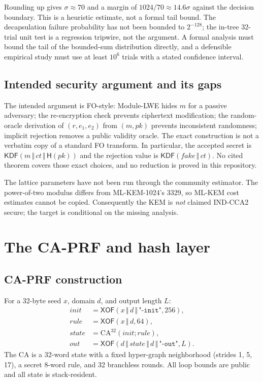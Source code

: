 \documentclass[11pt,a4paper]{article}
\theoremstyle{plain}
\theoremstyle{definition}
\theoremstyle{remark}
\newcommand{\concat}{\,\Vert\,}
\newcommand{\Hash}{\mathsf{H}}
\newcommand{\XOF}{\mathsf{XOF}}
\newcommand{\KDF}{\mathsf{KDF}}
\begin{document}
Rounding up gives $\sigma\approx 70$ and a margin of
$1024/70\approx 14.6\sigma$ against the decision boundary.  This is a
heuristic estimate, not a formal tail bound.  The decapsulation failure
probability has not been bounded to $2^{-128}$; the in-tree 32-trial
unit test is a regression tripwire, not the argument.  A formal
analysis must bound the tail of the bounded-sum distribution directly,
and a defensible empirical study must use at least $10^6$ trials with a
stated confidence interval.

\subsection{Intended security argument and its gaps}

The intended argument is FO-style: Module-LWE hides $m$ for a passive
adversary; the re-encryption check prevents ciphertext modification;
the random-oracle derivation of $(r,e_1,e_2)$ from $(m,pk)$ prevents
inconsistent randomness; implicit rejection removes a public validity
oracle.  The exact construction is not a verbatim copy of a standard FO
transform.  In particular, the accepted secret is
$\KDF(m\concat ct\concat\Hash(pk))$ and the rejection value is
$\KDF(\mathit{fake}\concat ct)$.  No cited theorem covers those exact
choices, and no reduction is proved in this repository.

The lattice parameters have not been run through the community
estimator.  The power-of-two modulus differs from ML-KEM-1024's 3329,
so ML-KEM cost estimates cannot be copied.  Consequently the KEM is
\emph{not} claimed IND-CCA2 secure; the target is conditional on the
missing analysis.

\section{The CA-PRF and hash layer}
\label{sec:hash}

\subsection{CA-PRF construction}

For a 32-byte seed $x$, domain $d$, and output length $L$:
\[
 \begin{aligned}
 \mathit{init}&=\XOF(x\concat d\concat\texttt{"-init"},256),\\
 \mathit{rule}&=\XOF(x\concat d,64),\\
 \mathit{state}&=\mathrm{CA}^{32}(\mathit{init};\mathit{rule}),\\
 \mathit{out}&=\XOF(d\concat\mathit{state}\concat d\concat
 \texttt{"-out"},L).
 \end{aligned}
\]
The CA is a 32-word state with a fixed hyper-graph neighborhood
(strides 1, 5, 17), a secret 8-word rule, and 32 branchless rounds.
All loop bounds are public and all state is stack-resident.
\end{document}
